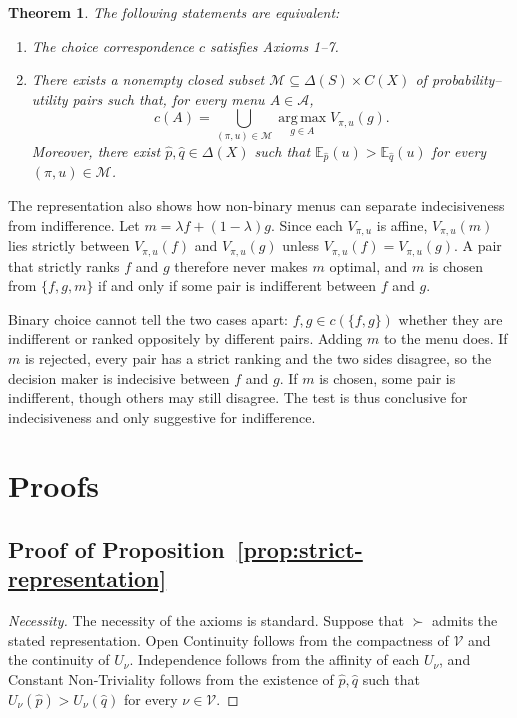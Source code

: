 \documentclass[11pt]{article}
\newtheorem{theorem}{Theorem}
\begin{document}
\begin{theorem}\label{thm:representation}
The following statements are equivalent:
\begin{enumerate}
    \item[(1)] The choice correspondence $c$ satisfies Axioms 1--7.
    \item[(2)] There exists a nonempty closed subset
    $\mathcal{M}\subseteq\Delta(S)\times C(X)$ of probability--utility pairs
    such that, for every menu $A\in\mathcal{A}$,
    \[
        c(A)=\bigcup_{(\pi,u)\in\mathcal{M}}
        \operatorname*{arg\,max}_{g\in A} V_{\pi,u}(g).
    \]
    Moreover, there exist $\hat p,\hat q\in\Delta(X)$ such that
    $\mathds{E}_{\hat p}(u)>\mathds{E}_{\hat q}(u)$
    for every $(\pi,u)\in\mathcal{M}$.
\end{enumerate}
\end{theorem}

The representation also shows how non-binary menus can separate
indecisiveness from indifference. Let $m=\lambda f+(1-\lambda)g$. Since each
$V_{\pi,u}$ is affine, $V_{\pi,u}(m)$ lies strictly between $V_{\pi,u}(f)$
and $V_{\pi,u}(g)$ unless $V_{\pi,u}(f)=V_{\pi,u}(g)$. A pair that strictly
ranks $f$ and $g$ therefore never makes $m$ optimal, and $m$ is chosen from
$\{f,g,m\}$ if and only if some pair is indifferent between $f$ and $g$.

Binary choice cannot tell the two cases apart: $f,g\in c(\{f,g\})$ whether
they are indifferent or ranked oppositely by different pairs. Adding $m$ to
the menu does. If $m$ is rejected, every pair has a strict ranking and the
two sides disagree, so the decision maker is indecisive between $f$ and $g$.
If $m$ is chosen, some pair is indifferent, though others may still disagree.
The test is thus conclusive for indecisiveness and only suggestive for
indifference.

\appendix
\section{Proofs} \label{sec:appendix}

\subsection{Proof of Proposition~\ref{prop:strict-representation}}

\begin{proof}[\textnormal{\textit{Necessity}}]
The necessity of the axioms is standard. Suppose that $\succ$ admits the
stated representation. Open Continuity
follows from the compactness of $\mathcal{V}$ and the continuity of
$U_\nu$. Independence follows from the affinity of each $U_\nu$, and
Constant Non-Triviality follows from the existence of $\hat p,\hat q$
such that $U_\nu(\hat p)>U_\nu(\hat q)$ for every $\nu\in\mathcal{V}$.
\end{proof}
\end{document}
